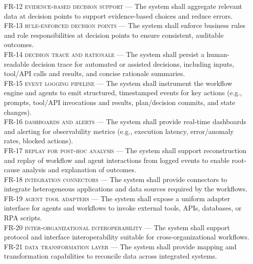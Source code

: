 \begin{footnotesize}
\noindent \textsc{FR-12 evidence-based decision support} --- The system shall aggregate relevant data at decision points to support evidence-based choices and reduce errors. \\
\noindent \textsc{FR-13 rule-enforced decision points} --- The system shall enforce business rules and role responsibilities at decision points to ensure consistent, auditable outcomes. \\
\noindent \textsc{FR-14 decision trace and rationale} --- The system shall persist a human-readable decision trace for automated or assisted decisions, including inputs, tool/API calls and results, and concise rationale summaries. \\
\noindent \textsc{FR-15 event logging pipeline} --- The system shall instrument the workflow engine and agents to emit structured, timestamped events for key actions (e.g., prompts, tool/API invocations and results, plan/decision commits, and state changes). \\
\noindent \textsc{FR-16 dashboards and alerts} --- The system shall provide real-time dashboards and alerting for observability metrics (e.g., execution latency, error/anomaly rates, blocked actions). \\
\noindent \textsc{FR-17 replay for post-hoc analysis} --- The system shall support reconstruction and replay of workflow and agent interactions from logged events to enable root-cause analysis and explanation of outcomes. \\
\noindent \textsc{FR-18 integration connectors} --- The system shall provide connectors to integrate heterogeneous applications and data sources required by the workflows. \\
\noindent \textsc{FR-19 agent tool adapters} --- The system shall expose a uniform adapter interface for agents and workflows to invoke external tools, APIs, databases, or RPA scripts. \\
\noindent \textsc{FR-20 inter-organizational interoperability} --- The system shall support protocol and interface interoperability suitable for cross-organizational workflows. \\
\noindent \textsc{FR-21 data transformation layer} --- The system shall provide mapping and transformation capabilities to reconcile data across integrated systems. \\
\end{footnotesize}

